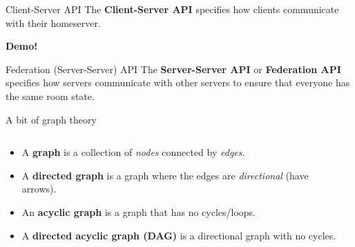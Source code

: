 \documentclass{acm}
\begin{document}
\begin{frame}[fragile]{Client-Server API}
    The \textbf{Client-Server API} specifies how clients communicate with their
    homeserver.
    \pause
    \vspace{1in}

    \Huge
    \textbf{Demo!}
\end{frame}

\begin{frame}{Federation (Server-Server) API}
    The \textbf{Server-Server API} or \textbf{Federation API} specifies how
    servers communicate with other servers to ensure that everyone has the same
    room state.
\end{frame}

\begin{frame}{A bit of graph theory}
    \begin{columns}
    \begin{column}{0.6\textwidth}
        \begin{itemize}[<+->]
            \item A \textbf{graph} is a collection of \textit{nodes} connected by
                \textit{edges}.
            \item A \textbf{directed graph} is a graph where the edges are
                \textit{directional} (have arrows).
            \item An \textbf{acyclic graph} is a graph that has no cycles/loops.
            \item A \textbf{directed acyclic graph (DAG)} is a directional graph
                with no cycles.
        \end{itemize}
    \end{column}%
    \begin{column}{0.4\textwidth} %
\end{column}
\end{columns}
\end{frame}
\end{document}
